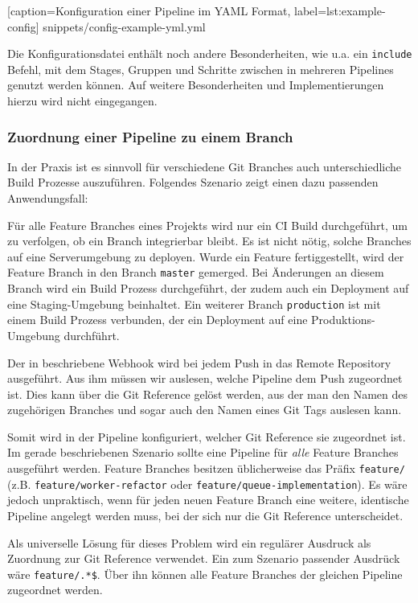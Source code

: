 
  [caption={Konfiguration einer Pipeline im YAML Format},
  label={lst:example-config}]
  {snippets/config-example-yml.yml}

Die Konfigurationsdatei enthält noch andere Besonderheiten, wie u.a. ein \texttt{include} Befehl, mit dem Stages, Gruppen und Schritte zwischen in mehreren Pipelines genutzt werden können. Auf weitere Besonderheiten und Implementierungen hierzu wird nicht eingegangen.

\subsubsection{Zuordnung einer Pipeline zu einem Branch}
\label{subsec:git-reference}

In der Praxis ist es sinnvoll für verschiedene Git Branches auch unterschiedliche Build Prozesse auszuführen. Folgendes Szenario zeigt einen dazu passenden Anwendungsfall:

Für alle Feature Branches eines Projekts wird nur ein \ac{CI} Build durchgeführt, um zu verfolgen, ob ein Branch integrierbar bleibt. Es ist nicht nötig, solche Branches auf eine Serverumgebung zu deployen. Wurde ein Feature fertiggestellt, wird der Feature Branch in den Branch \texttt{master} gemerged. Bei Änderungen an diesem Branch wird ein Build Prozess durchgeführt, der zudem auch ein Deployment auf eine Staging-Umgebung beinhaltet. Ein weiterer Branch \texttt{production} ist mit einem Build Prozess verbunden, der ein Deployment auf eine Produktions-Umgebung durchführt.

Der in  beschriebene Webhook wird bei jedem Push in das Remote Repository ausgeführt. Aus ihm müssen wir auslesen, welche Pipeline dem Push zugeordnet ist. Dies kann über die Git Reference gelöst werden, aus der man den Namen des zugehörigen Branches und sogar auch den Namen eines Git Tags auslesen kann.

Somit wird in der Pipeline konfiguriert, welcher Git Reference sie zugeordnet ist. Im gerade beschriebenen Szenario sollte eine Pipeline für \emph{alle} Feature Branches ausgeführt werden. Feature Branches besitzen üblicherweise das Präfix \texttt{feature/} (z.B. \texttt{feature/worker\allowbreak -refactor} oder \texttt{feature/queue\allowbreak -implementation}). Es wäre jedoch unpraktisch, wenn für jeden neuen Feature Branch eine weitere, identische Pipeline angelegt werden muss, bei der sich nur die Git Reference unterscheidet.

Als universelle Lösung für dieses Problem wird ein regulärer Ausdruck als Zuordnung zur Git Reference verwendet. Ein zum Szenario passender Ausdrück wäre \texttt{feature/.*\$}. Über ihn können alle Feature Branches der gleichen Pipeline zugeordnet werden.

